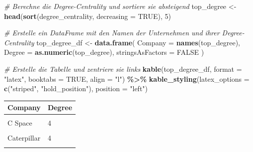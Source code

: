 \documentclass[
]{article}
\newenvironment{Shaded}{\begin{snugshade}}{\end{snugshade}}
\newcommand{\AttributeTok}[1]{\textcolor[rgb]{0.13,0.29,0.53}{#1}}
\newcommand{\CommentTok}[1]{\textcolor[rgb]{0.56,0.35,0.01}{\textit{#1}}}
\newcommand{\ConstantTok}[1]{\textcolor[rgb]{0.56,0.35,0.01}{#1}}
\newcommand{\DecValTok}[1]{\textcolor[rgb]{0.00,0.00,0.81}{#1}}
\newcommand{\FunctionTok}[1]{\textcolor[rgb]{0.13,0.29,0.53}{\textbf{#1}}}
\newcommand{\NormalTok}[1]{#1}
\newcommand{\OtherTok}[1]{\textcolor[rgb]{0.56,0.35,0.01}{#1}}
\newcommand{\SpecialCharTok}[1]{\textcolor[rgb]{0.81,0.36,0.00}{\textbf{#1}}}
\newcommand{\StringTok}[1]{\textcolor[rgb]{0.31,0.60,0.02}{#1}}
\begin{document}
\begin{Shaded}
\begin{Highlighting}[]
\CommentTok{\# Berechne die Degree{-}Centrality und sortiere sie absteigend}
\NormalTok{top\_degree }\OtherTok{\textless{}{-}} \FunctionTok{head}\NormalTok{(}\FunctionTok{sort}\NormalTok{(degree\_centrality, }\AttributeTok{decreasing =} \ConstantTok{TRUE}\NormalTok{), }\DecValTok{5}\NormalTok{)}

\CommentTok{\# Erstelle ein DataFrame mit den Namen der Unternehmen und ihrer Degree{-}Centrality}
\NormalTok{top\_degree\_df }\OtherTok{\textless{}{-}} \FunctionTok{data.frame}\NormalTok{(}
  \AttributeTok{Company =} \FunctionTok{names}\NormalTok{(top\_degree),}
  \AttributeTok{Degree =} \FunctionTok{as.numeric}\NormalTok{(top\_degree),}
  \AttributeTok{stringsAsFactors =} \ConstantTok{FALSE}
\NormalTok{)}

\CommentTok{\# Erstelle die Tabelle und zentriere sie links}
\FunctionTok{kable}\NormalTok{(top\_degree\_df, }\AttributeTok{format =} \StringTok{"latex"}\NormalTok{, }\AttributeTok{booktabs =} \ConstantTok{TRUE}\NormalTok{, }\AttributeTok{align =} \StringTok{"l"}\NormalTok{) }\SpecialCharTok{\%\textgreater{}\%}
  \FunctionTok{kable\_styling}\NormalTok{(}\AttributeTok{latex\_options =} \FunctionTok{c}\NormalTok{(}\StringTok{"striped"}\NormalTok{, }\StringTok{"hold\_position"}\NormalTok{), }\AttributeTok{position =} \StringTok{"left"}\NormalTok{)}
\end{Highlighting}
\end{Shaded}

\begin{tabular}{ll}
\toprule
Company & Degree\\
\midrule
\cellcolor{gray!10}{Accenture} & \cellcolor{gray!10}{6}\\
C Space & 4\\
\cellcolor{gray!10}{Capgemini} & \cellcolor{gray!10}{4}\\
Caterpillar & 4\\
\cellcolor{gray!10}{Liberty Mutual Insurance} & \cellcolor{gray!10}{4}\\
\bottomrule
\end{tabular}
\end{document}
